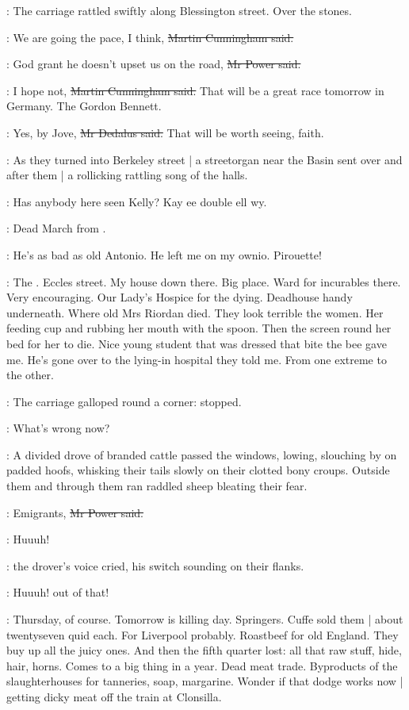 :
The carriage rattled swiftly along Blessington street.
Over the stones.

\cunningham:
We are going the pace, I think,
\sout{Martin Cunningham said.}

\power:
God grant he doesn't upset us on the road,
\sout{Mr Power said.}

\cunningham:
I hope not,
\sout{Martin Cunningham said.}
That will be a great race tomorrow in Germany.
The Gordon Bennett.

\simon:
Yes, by Jove,
\sout{Mr Dedalus said.}
That will be worth seeing, faith.

:
As they turned into Berkeley street |
a streetorgan near the Basin sent over and after them |
a rollicking rattling song of the halls.

\man:
Has anybody here seen Kelly?
Kay ee double ell wy.

\BloomInt:
Dead March from .

\man:
He's as bad
as old Antonio.
He left me on my ownio.
Pirouette!

\BloomInt:
The .
Eccles street.
My house down there.
Big place.
Ward for incurables there.
Very encouraging.
Our Lady's Hospice for the dying.
Deadhouse handy underneath.
Where old Mrs Riordan died.
They look terrible the women.
Her feeding cup and rubbing her mouth with the spoon.
Then the screen round her bed for her to die.
Nice young student that was dressed that bite the bee gave me.
He's gone over to the lying-in hospital they told me.
From one extreme to the other.

:
The carriage galloped round a corner:
stopped.

\cunningham:
What's wrong now?

:
A divided drove of branded cattle passed the windows,
lowing,
slouching by on padded hoofs,
whisking their tails slowly on their clotted bony croups.
Outside them and through them
ran raddled sheep
bleating their fear.

\power:
Emigrants,
\sout{Mr Power said.}

\drover:
Huuuh!

:
the drover's voice cried,
his switch sounding on their flanks.

\drover:
Huuuh!
out of that!

\BloomInt:
Thursday, of course.
Tomorrow is killing day.
Springers.
Cuffe sold them |
about twentyseven quid each.
For Liverpool probably.
Roastbeef for old England.
They buy up all the juicy ones.
And then the fifth quarter lost:
all that raw stuff, hide, hair, horns.
Comes to a big thing in a year.
Dead meat trade.
Byproducts of the slaughterhouses for tanneries, soap, margarine.
Wonder if that dodge works now |
getting dicky meat off the train at Clonsilla.

